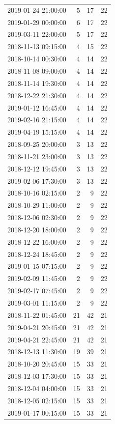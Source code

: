 \begin{tabular}{lrrr}
2019-01-24 21:00:00 & 5 & 17 & 22 \\
2019-01-29 00:00:00 & 6 & 17 & 22 \\
2019-03-11 22:00:00 & 5 & 17 & 22 \\
2018-11-13 09:15:00 & 4 & 15 & 22 \\
2018-10-14 00:30:00 & 4 & 14 & 22 \\
2018-11-08 09:00:00 & 4 & 14 & 22 \\
2018-11-14 19:30:00 & 4 & 14 & 22 \\
2018-12-22 21:30:00 & 4 & 14 & 22 \\
2019-01-12 16:45:00 & 4 & 14 & 22 \\
2019-02-16 21:15:00 & 4 & 14 & 22 \\
2019-04-19 15:15:00 & 4 & 14 & 22 \\
2018-09-25 20:00:00 & 3 & 13 & 22 \\
2018-11-21 23:00:00 & 3 & 13 & 22 \\
2018-12-12 19:45:00 & 3 & 13 & 22 \\
2019-02-06 17:30:00 & 3 & 13 & 22 \\
2018-10-16 02:15:00 & 2 & 9 & 22 \\
2018-10-29 11:00:00 & 2 & 9 & 22 \\
2018-12-06 02:30:00 & 2 & 9 & 22 \\
2018-12-20 18:00:00 & 2 & 9 & 22 \\
2018-12-22 16:00:00 & 2 & 9 & 22 \\
2018-12-24 18:45:00 & 2 & 9 & 22 \\
2019-01-15 07:15:00 & 2 & 9 & 22 \\
2019-02-09 11:45:00 & 2 & 9 & 22 \\
2019-02-17 07:45:00 & 2 & 9 & 22 \\
2019-03-01 11:15:00 & 2 & 9 & 22 \\
2018-11-22 01:45:00 & 21 & 42 & 21 \\
2019-04-21 20:45:00 & 21 & 42 & 21 \\
2019-04-21 22:45:00 & 21 & 42 & 21 \\
2018-12-13 11:30:00 & 19 & 39 & 21 \\
2018-10-20 20:45:00 & 15 & 33 & 21 \\
2018-12-03 17:30:00 & 15 & 33 & 21 \\
2018-12-04 04:00:00 & 15 & 33 & 21 \\
2018-12-05 02:15:00 & 15 & 33 & 21 \\
2019-01-17 00:15:00 & 15 & 33 & 21 \\

\end{tabular}
